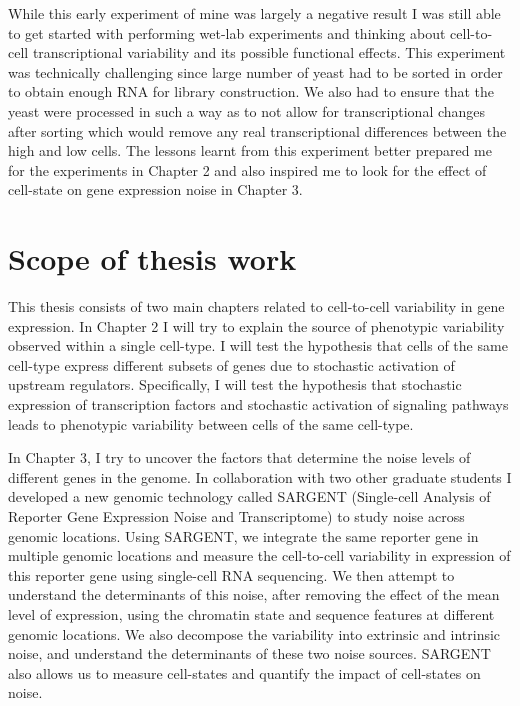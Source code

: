 While this early experiment of mine was largely a negative result I was still able to get started with performing wet-lab experiments and thinking about cell-to-cell transcriptional variability and its possible functional effects. This experiment was technically challenging since large number of yeast had to be sorted in order to obtain enough RNA for library construction. We also had to ensure that the yeast were processed in such a way as to not allow for transcriptional changes after sorting which would remove any real transcriptional differences between the high and low cells. The lessons learnt from this experiment better prepared me for the experiments in Chapter 2 and also inspired me to look for the effect of cell-state on gene expression noise in Chapter 3.

\section{Scope of thesis work}

This thesis consists of two main chapters related to cell-to-cell variability in gene expression. In  Chapter 2 I will try to explain the source of phenotypic variability observed within a single cell-type. I will test the hypothesis that cells of the same cell-type express different subsets of genes due to stochastic activation of upstream regulators. Specifically, I will test the hypothesis that stochastic expression of transcription factors and stochastic activation of signaling pathways leads to phenotypic variability between cells of the same cell-type.

In Chapter 3, I try to uncover the factors that determine the noise levels of different genes in the genome. In collaboration with two other graduate students I developed a new genomic technology called SARGENT (Single-cell Analysis of Reporter Gene Expression Noise and Transcriptome) to study noise across genomic locations. Using SARGENT, we integrate the same reporter gene in multiple genomic locations and measure the cell-to-cell variability in expression of this reporter gene using single-cell RNA sequencing. We then attempt to understand the determinants of this noise, after removing the effect of the mean level of expression, using the chromatin state and sequence features at different genomic locations. We also decompose the variability into extrinsic and intrinsic noise, and understand the determinants of these two noise sources. SARGENT also allows us to measure cell-states and quantify the impact of cell-states on noise.

